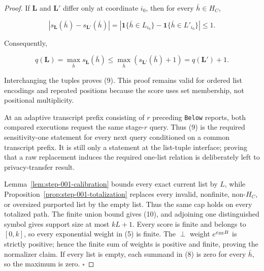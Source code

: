 \begin{proof}
If \(\mathbf L\) and \(\mathbf L'\) differ only at coordinate
\(i_0\), then for every \(\bar h\in H_C\),

\[
 |s_{\mathbf L}(\bar h)-s_{\mathbf L'}(\bar h)|
 =|\mathbf1\{\bar h\in L_{i_0}\}
   -\mathbf1\{\bar h\in L'_{i_0}\}|
 \leq1.
 \tag{11}
\]

Consequently,

\[
 q(\mathbf L)
 =\max_{\bar h}s_{\mathbf L}(\bar h)
 \leq\max_{\bar h}(s_{\mathbf L'}(\bar h)+1)
 =q(\mathbf L')+1.
\]

Interchanging the tuples proves (9). This proof remains valid for ordered
list encodings and repeated positions because the score uses set
membership, not positional multiplicity.

At an adaptive transcript prefix consisting of \(r\) preceding \texttt{Below}
reports, both compared executions request the same stage-\(r\) query. Thus
(9) is the required sensitivity-one statement for every next query
conditioned on a common transcript prefix. It is still only a statement at
the list-tuple interface; proving that a raw replacement induces the
required one-list relation is deliberately left to privacy-transfer result.

Lemma~\ref{lem:step-001-calibration} bounds every exact current
list by \(L\), while Proposition~\ref{prop:step-001-totalization} replaces every invalid,
nonfinite, non-\(H_C\), or oversized purported list by the empty list. Thus
the same cap holds on every totalized path. The finite union bound gives
(10), and adjoining one distinguished symbol gives support size at most
\(kL+1\). Every score is finite and belongs to \([0,k]\), so every
exponential weight in (5) is finite. The \(\perp\) weight
\(e^{\varepsilon_{\rm SS}B}\) is strictly positive; hence the finite sum of
weights is positive and finite, proving the normalizer claim. If every
list is empty, each summand in (8) is zero for every \(\bar h\), so the
maximum is zero. \(\square\)


\end{proof}

